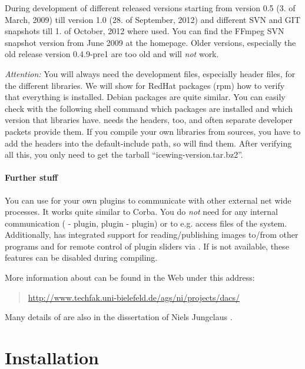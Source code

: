 \begin{itemize}
  During development of \icewing{} different released versions
  starting from version 0.5 (3. of March, 2009) till version 1.0
  (28. of September, 2012) and different SVN and GIT snapshots till
  1. of October, 2012 where used. You can find the FFmpeg SVN
  snapshot version from June 2009 at the \icewing{} homepage. Older
  versions, especially the old release version 0.4.9-pre1 are too
  old and will \emph{not} work.
\end{itemize}

\emph{Attention:} You will always need the development files,
especially header files, for the different libraries. We will show
for RedHat packages (rpm) how to verify that everything is
installed. Debian packages are quite similar. You can easily check
with the following shell command
\sS
{}
\sE
which packages are installed and which version that libraries have.
\icewing{} needs the headers, too, and often separate developer packets
provide them. If you compile your own libraries from sources, you
have to add the headers into the default-include path, so \icewing{}
will find them. After verifying all this, you only need to get the
\icewing{} tarball ``icewing-version.tar.bz2''.

\paragraph{Further stuff}

You can use \dacs{} for your own \icewing{} plugins to
communicate with other external net wide processes. It works quite
similar to Corba. You do {\em not} need \dacs{} for any \icewing{}
internal communication (\icewing{} - plugin, plugin - plugin) or to
e.g. access files of the system. Additionally, \icewing{} has
integrated support for reading/publishing images to/from other
programs and for remote control of plugin sliders via \dacs{}. If
\dacs{} is not available, these features can be disabled during
compiling.

More information about \dacs{} can be found in the Web under this
address:
\begin{quotation}
\url{http://www.techfak.uni-bielefeld.de/ags/ni/projects/dacs/}
\end{quotation}
Many details of \dacs{} are also in the dissertation of Niels
Jungclaus \cite{Jungclaus1998-IVS}.


\section{Installation}

